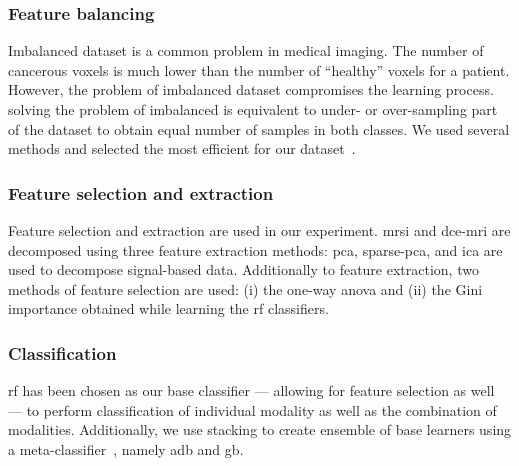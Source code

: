 \subsubsection{Feature balancing}\label{subsec:chp6:method:fea-bal}
Imbalanced dataset is a common problem in medical imaging.
The number of cancerous voxels is much lower than the number of
``healthy'' voxels for a patient.
However, the problem of imbalanced dataset compromises the learning
process.
solving the problem of imbalanced is equivalent to under- or
over-sampling part of the dataset to obtain equal number of samples
in both classes.
We used several methods and selected the most efficient for our
dataset~\cite{imblearn}.

\subsubsection{Feature selection and extraction}\label{subsec:chp6:method:fea-sel}

Feature selection and extraction are used in our experiment.
\ac{mrsi} and \ac{dce}-\ac{mri} are decomposed using three feature
extraction methods: \ac{pca}, sparse-\ac{pca}, and \ac{ica} are used
to decompose signal-based data.
Additionally to feature extraction, two methods of feature selection
are used: (i) the one-way \ac{anova} and (ii) the Gini importance
obtained while learning the \ac{rf} classifiers.

\subsubsection{Classification}\label{subsec:chp6:method:clas}

\ac{rf} has been chosen as our base classifier --- allowing for
feature selection as well --- to perform classification of individual
modality as well as the combination of modalities.
Additionally, we use stacking to create ensemble of base learners
using a meta-classifier~\cite{wolpert1992stacked}, namely \ac{adb} and \ac{gb}.

